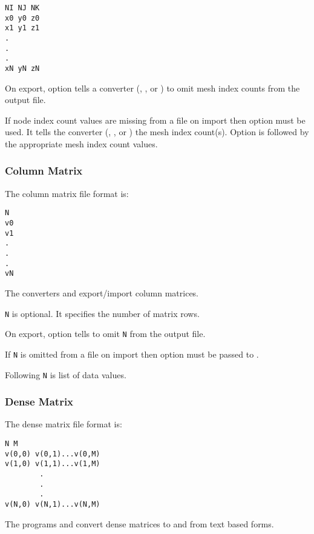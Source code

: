 \begin{verbatim}
NI NJ NK
x0 y0 z0
x1 y1 z1
.
.
.
xN yN zN
\end{verbatim}

On export, option  tells a converter
(, , or
) to omit mesh index counts
from the output file.

If node index count values are missing from a file on import then
option  must be used.  It tells the converter
(,
, or
) the mesh index count(s).  Option
 is followed by the appropriate mesh index count
values.

\subsubsection{Column Matrix}

The column matrix file format is:

\begin{verbatim}
N
v0 
v1
.
.
.
vN
\end{verbatim}

The converters  and  
export/import column matrices.

\verb|N| is optional.  It specifies the number of matrix rows.  

On export, option  tells
 to omit \verb|N| from the output file.

If \verb|N| is omitted from a file on import then option
 must be passed to .

Following \verb|N| is list of data values.

\subsubsection{Dense Matrix}

The dense matrix file format is:

\begin{verbatim}
N M
v(0,0) v(0,1)...v(0,M)
v(1,0) v(1,1)...v(1,M)
        .
        .
        .
v(N,0) v(N,1)...v(N,M)
\end{verbatim}

The programs  and  
convert dense matrices to and from text based forms.


